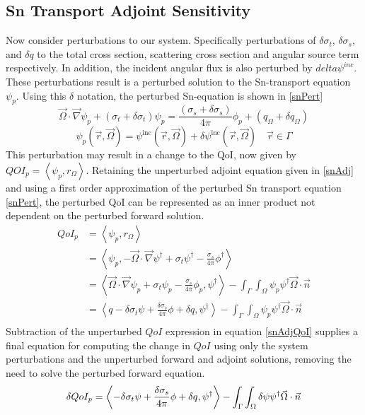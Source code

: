 \documentclass{article}
\newcommand{\vr}{\vec{r}}
\newcommand{\vO}{\vec{\Omega}}
\newcommand{\bra}{\left\langle}
\newcommand{\ket}{\right\rangle}
\newcommand{\vgrad}{\vec{\nabla}}
\newcommand{\sigt}{\sigma_t}
\newcommand{\sigs}{\sigma_s}
\newcommand{\angSource}{q_\Omega}
\newcommand{\scalSource}{q}
\newcommand{\angResp}{r_\Omega}
\begin{document}
\subsection{Sn Transport Adjoint Sensitivity}
Now consider perturbations to our system. Specifically perturbations of $\delta \sigt$, $\delta \sigs$, and $\delta q$ to the total cross section, scattering cross section and angular source term respectively. In addition, the incident angular flux is also perturbed by $delta \psi^{inc}$. These perturbations result is a perturbed solution to the Sn-transport equation $\psi_p$. Using this $\delta$ notation, the perturbed Sn-equation is shown in \ref{snPert}
\begin{equation}
\label{snPert}
\vO \cdot \vgrad \psi_p + \left( \sigt + \delta \sigt \right) \psi_p = \frac{\left( \sigs + \delta \sigs \right)}{4 \pi} \phi_p + \left( \angSource + \delta \angSource \right)
\end{equation}
\begin{equation}
\psi_p(\vr,\vO) = \psi^{\text{inc}}(\vr,\vO) + \delta \psi^{\text{inc}}(\vr,\vO)\quad \vr \in \Gamma
\end{equation}
This perturbation may result in a change to the QoI, now given by $QOI_p=\bra \psi_p , \angResp \ket$. Retaining the unperturbed adjoint equation given in \ref{snAdj} and using a first order approximation of the perturbed Sn transport equation \ref{snPert}, the perturbed QoI can be represented as an inner product not dependent on the perturbed forward solution.
\begin{equation}
\label{snSens}
\begin{split}
QoI_p &=\bra \psi_p , \angResp \ket \\
&=\bra \psi_p , - \vO \cdot \vgrad \psi^\dag + \sigt \psi^\dag - \frac{\sigs}{4 \pi} \phi^\dag  \ket \\
&= \bra  \vO \cdot \vgrad \psi_p + \sigt \psi_p - \frac{\sigs}{4 \pi} \phi_p , \psi^\dag  \ket - \int_{\Gamma} \int_{\Omega} \psi_p \psi^\dag \vO \cdot \vec{n}\\
&= \bra  \scalSource - \delta \sigt \psi + \frac{\delta\sigs}{4 \pi} \phi + \delta \scalSource , \psi^\dag  \ket - \int_{\Gamma} \int_{\Omega} \psi_p \psi^\dag \vO \cdot \vec{n}\\
\end{split}
\end{equation}
Subtraction of the unperturbed $QoI$ expression in equation \ref{snAdjQoI} supplies a final equation for computing the change in $QoI$ using only the system perturbations and the unperturbed forward and adjoint solutions, removing the need to solve the perturbed forward equation.
\begin{equation}
\delta QoI_p = \bra - \delta \sigt \psi + \frac{\delta\sigs}{4 \pi} \phi + \delta \scalSource , \psi^\dag  \ket - \int_{\Gamma} \int_{\Omega} \delta \psi \psi^\dag \vO \cdot \vec{n}\\
\end{equation}
\end{document}

